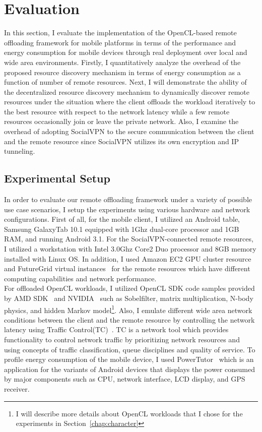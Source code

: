 \section{Evaluation}
\label{offloading:evaluation}
%
In this section, I evaluate the implementation of the OpenCL-based
remote offloading framework for mobile platforms in terms of the
performance and energy consumption for mobile devices through real
deployment over local and wide area environments.
%
Firstly, I quantitatively analyze the overhead of the proposed resource
discovery mechanism in terms of energy consumption as a function of
number of remote resources.
%
Next, I will demonstrate the ability of the decentralized resource
discovery mechanism to dynamically discover remote resources under the
situation where the client offloads the workload iteratively to the best
resource with respect to the network latency while a few remote
resources occasionally join or leave the private network.
%
Also, I examine the overhead of adopting SocialVPN to the secure
communication between the client and the remote resource since SocialVPN
utilizes its own encryption and IP tunneling.
%
\subsection{Experimental Setup}
\label{offloading:setup}
In order to evaluate our remote offloading framework under a variety of
possible use case scenarios, I setup the experiments using various
hardware and network configurations.
%
First of all, for the mobile client, I utilized an Android table,
Samsung GalaxyTab 10.1 equipped with 1Ghz dual-core processor and 1GB
RAM, and running Android 3.1.
%
For the SocialVPN-connected remote resources, I utilized a workstation
with Intel 3.0Ghz Core2 Duo processor and 8GB memory installed with
Linux OS.
%
In addition, I used Amazon EC2 GPU cluster resource~\cite{amazonec2} and
FutureGrid virtual instances~\cite{futuregrid} for the remote resources which have
different computing capabilities and network performance.\\
%
For offloaded OpenCL workloads, I utilized OpenCL SDK code samples
provided by AMD SDK~\cite{amd} and NVIDIA~\cite{nvidia} such as
Sobelfilter, matrix multiplication, N-body physics,
and hidden Markov model\footnote{I will describe more details about
OpenCL workloads that I chose for the experiments in
Section~\ref{chap:character}}.
%
Also, I emulate different wide area network conditions between the
client and the remote resource by controlling the network latency using
Traffic Control(TC)~\cite{tc}.
%
TC is a network tool which  provides functionality to control network
traffic by prioritizing network resources and using concepts of traffic
classification, queue disciplines and quality of service.
%
To profile energy consumption of the mobile device, I used
PowerTutor~\cite{powertutor} which is an application for the variants of
Android devices that displays the power consumed by major components
such as CPU, network interface, LCD display, and GPS receiver.
% 
